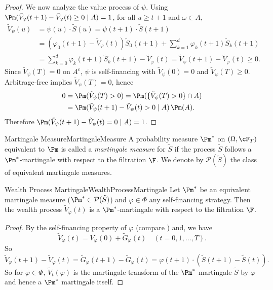 \begin{proof}
	We now analyze the value process of \(\psi\). Using \(\Pm(\tilde{V}_{\varphi}(t+1)-\tilde{V}_{\varphi}(t)\ge 0\mid A)=1\), for all \(u\ge t+1\) and \(\omega\in A\),
	\[
		\begin{aligned}
			\tilde{V}_{\psi}(u) & =\psi(u)\cdot\tilde{S}(u)=\psi(t+1)\cdot\tilde{S}(t+1)                                                                    \\
			                    & =(\varphi_0(t+1)-\tilde{V}_{\varphi}(t))\tilde{S}_0(t+1)+\sum_{k=1}^d \varphi_k(t+1)\tilde{S}_k(t+1)                      \\
			                    & =\sum_{k=0}^d \varphi_k(t+1)\tilde{S}_k(t+1)-\tilde{V}_{\varphi}(t)=\tilde{V}_{\varphi}(t+1)-\tilde{V}_{\varphi}(t)\ge 0.
		\end{aligned}
	\]
	Since \(\tilde{V}_{\psi}(T)=0\) on \(A^c\), \(\psi\) is self-financing with \(\tilde{V}_{\psi}(0)=0\) and \(\tilde{V}_{\psi}(T)\ge 0\). Arbitrage-free implies \(\tilde{V}_{\psi}(T)=0\), hence
	\[
		\begin{aligned}
			0 & =\Pm(\tilde{V}_{\psi}(T)>0)=\Pm(\{\tilde{V}_{\psi}(T)>0\}\cap A) \\
			  & =\Pm(\tilde{V}_{\psi}(t+1)-\tilde{V}_{\psi}(t)>0\mid A)\,\Pm(A).
		\end{aligned}
	\]
	Therefore \(\Pm(\tilde{V}_{\psi}(t+1)-\tilde{V}_{\psi}(t)=0\mid A)=1\).
\end{proof}

\begin{defn}{Martingale Measure}{MartingaleMeasure}
	A probability measure \(\Pm^*\) on \((\Omega, \cF_T)\) equivalent to \(\Pm\) is called a \textit{martingale measure} for \(\tilde{S}\) if the process \(\tilde{S}\) follows a \(\Pm^*\)-martingale with respect to the filtration \(\F\). We denote by \(\mathcal{P}(\tilde{S})\) the class of equivalent martingale measures.
\end{defn}

\begin{prop}{Wealth Process Martingale}{WealthProcessMartingale}
	Let \(\Pm^*\) be an equivalent martingale measure (\(\Pm^* \in \mathcal{P}(\tilde{S})\)) and \(\varphi \in \Phi\) any self-financing strategy. Then the wealth process \(\tilde{V}_{\varphi}(t)\) is a \(\Pm^*\)-martingale with respect to the filtration \(\F\).
\end{prop}

\begin{proof}
	By the self-financing property of \(\varphi\) (compare ) and, we have
	\[
		\tilde{V}_{\varphi}(t) = V_{\varphi}(0) + \tilde{G}_{\varphi}(t) \quad (t = 0, 1, \dots, T).
	\]
	So
	\[
		\tilde{V}_{\varphi}(t+1) - \tilde{V}_{\varphi}(t) = \tilde{G}_{\varphi}(t+1) - \tilde{G}_{\varphi}(t) = \varphi(t+1) \cdot (\tilde{S}(t+1) - \tilde{S}(t)).
	\]
	So for \(\varphi \in \Phi\), \(\tilde{V}_t(\varphi)\) is the martingale transform of the \(\Pm^*\) martingale \(\tilde{S}\) by \(\varphi\) and hence a \(\Pm^*\) martingale itself.
\end{proof}

